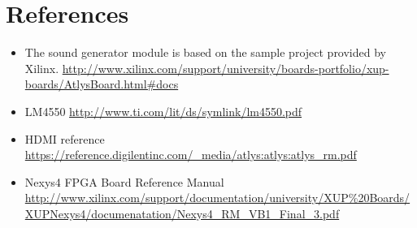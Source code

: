 
\section{References}
\begin{itemize} 
\item The sound generator module is based on the sample project provided by Xilinx. \url{http://www.xilinx.com/support/university/boards-portfolio/xup-boards/AtlysBoard.html#docs}
\item LM4550 \url{http://www.ti.com/lit/ds/symlink/lm4550.pdf}
\item HDMI reference \url{https://reference.digilentinc.com/_media/atlys:atlys:atlys_rm.pdf}
\item Nexys4 FPGA Board Reference Manual \url{http://www.xilinx.com/support/documentation/university/XUP\%20Boards/XUPNexys4/documenatation/Nexys4_RM_VB1_Final_3.pdf}
\end{itemize}


